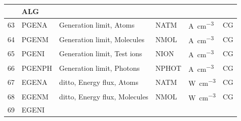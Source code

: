 \begin{landscape}
\begin{longtable}{|r|l|l|l|l|c|}
                                                                   & ALG
    \\  \hline
    63                                                             & PGENA
                                                                   & Generation limit, Atoms
                                                                   & NATM                      & \si{\ampere\per\cubic\centi\metre}
                                                                   & CG
    \\ \hline
    64                                                             & PGENM
                                                                   & Generation limit,
    Molecules                                                      & NMOL                      &
    \si{\ampere\per\cubic\centi\metre}                             & CG
    \\ \hline
    65                                                             & PGENI
                                                                   & Generation limit, Test
    ions                                                           & NION                      &
    \si{\ampere\per\cubic\centi\metre}                             & CG
    \\ \hline
    66                                                             & PGENPH
                                                                   & Generation limit, Photons
                                                                   & NPHOT                     & \si{\ampere\per\cubic\centi\metre}
                                                                   & CG
    \\ \hline
    67                                                             & EGENA
                                                                   & ditto, Energy flux, Atoms
                                                                   & NATM                      & \si{\watt\per\cubic\centi\metre}
                                                                   & CG
    \\ \hline
    68                                                             & EGENM
                                                                   & ditto, Energy flux,
    Molecules                                                      & NMOL                      &
    \si{\watt\per\cubic\centi\metre}                               & CG
    \\ \hline
    69                                                             & EGENI

\end{longtable}
\end{landscape}
